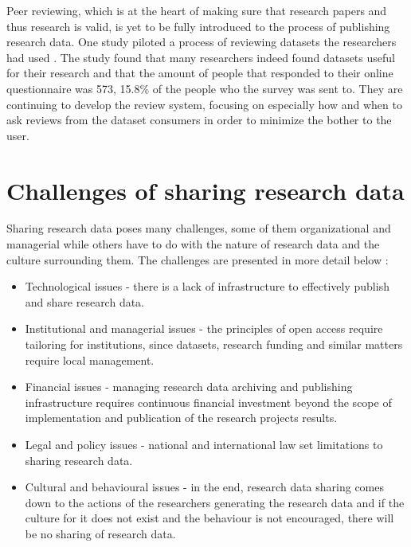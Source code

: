 Peer reviewing, which is at the heart of making sure that research papers
and thus research is valid, is yet to be fully introduced to the process of
publishing research data. One study piloted a process of reviewing datasets
the researchers had used \cite{DBLP:journals/ijdc/GrootveldE12}. The study found
that many researchers indeed found datasets useful for their research and that
the amount of people that responded to their online questionnaire was 573,
15.8\% of the people who the survey was sent to. They are continuing to develop
the review system, focusing on especially how and when to ask reviews from the
dataset consumers in order to minimize the bother to the user.

\section{Challenges of sharing research data}
\label{sec:research_data_challenges}

Sharing research data poses many challenges, some of them organizational and
managerial while others have to do with the nature of research data and the
culture surrounding them. The challenges are presented in more detail below
\cite{DBLP:journals/datascience/ArzbergerSBBCLMUW04, tenopir2011data}:

\begin{itemize}
    \item Technological issues - there is a lack of infrastructure to
          effectively publish and share research data.
    \item Institutional and managerial issues - the principles of open access
          require tailoring for institutions, since datasets, research funding
          and similar matters require local management.
    \item Financial issues - managing research data archiving and publishing
          infrastructure requires continuous financial investment beyond the
          scope of implementation and publication of the research projects
          results.
    \item Legal and policy issues - national and international law set
          limitations to sharing research data.
    \item Cultural and behavioural issues - in the end, research data sharing
          comes down to the actions of the researchers generating the research
          data and if the culture for it does not exist and the behaviour is
          not encouraged, there will be no sharing of research data.
\end{itemize}

